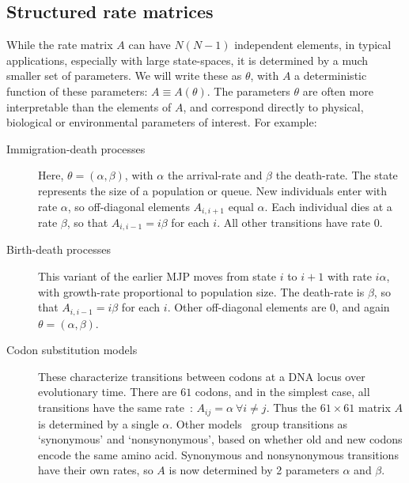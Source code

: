 \subsection{Structured rate matrices}
While the rate matrix $A$ can have $N(N-1)$ independent elements, in typical applications, especially with large state-spaces, it is determined by a much smaller set of parameters. 
We will write these as $\theta$, with $A$ a deterministic function of these parameters: $A \equiv A(\theta)$. 
The parameters $\theta$ are often more interpretable than the elements of $A$, and correspond directly to physical, biological or environmental parameters of interest. 
For example:
\begin{description}
  \item[Immigration-death processes] 
    Here, $\theta = (\alpha,\beta)$, with $\alpha$ the arrival-rate and $\beta$ the death-rate. 
    The state represents the size of a population or queue. 
    New individuals enter with rate $\alpha$, so off-diagonal elements $A_{i,i+1}$ equal $\alpha$.
    Each individual dies at a rate $\beta$, so that $A_{i,i-1}=i\beta$ for each $i$.
    All other transitions have rate $0$. 
  \item[Birth-death processes] 
    This variant of the earlier MJP moves from state $i$ to $i+1$ with rate $i\alpha$, with growth-rate proportional to population size. 
    The death-rate is $\beta$, so that $A_{i,i-1}=i\beta$ for each $i$.
    Other off-diagonal elements are $0$, and again $\theta=(\alpha,\beta)$.
  \item[Codon substitution models] 
    These characterize transitions between codons at a DNA locus over evolutionary time. 
    There are $61$ codons, and in the simplest case, all transitions have the same rate~\citep{jukescantor69}: $A_{ij} = \alpha\ \forall i \neq j$. 
    Thus the $61\times 61$ matrix $A$ is determined by a single $\alpha$. 
    Other models~\citep{goldman1994codon} group transitions as `synonymous' and `nonsynonymous', based on whether old and new codons encode the same amino acid. 
    Synonymous and nonsynonymous transitions have their own rates, so $A$ is now determined by 2 parameters $\alpha$ and $\beta$. 
\end{description}
